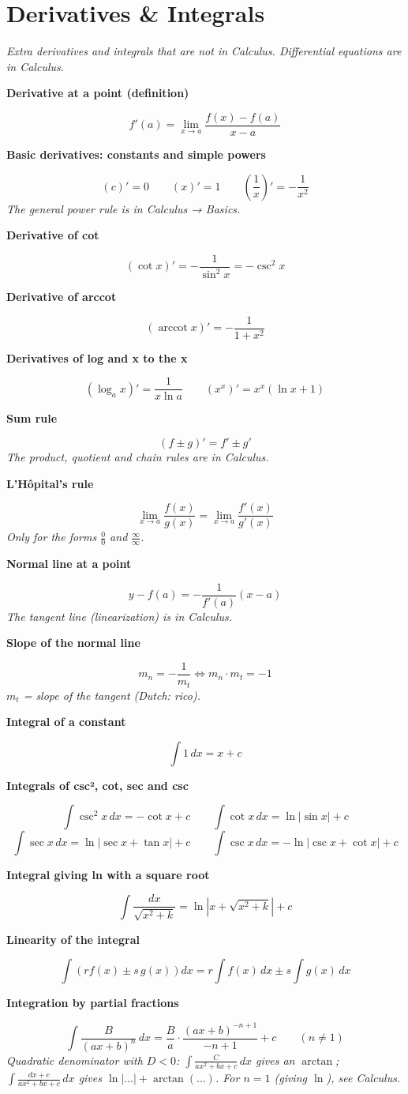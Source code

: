 \documentclass[11pt]{article}
\newcommand{\sect}[2]{\section*{\color{#1}#2}}
\newcommand{\sub}[1]{\par\medskip\textbf{#1}\par}
\newcommand{\expl}[1]{{\color{gray}\itshape #1}\par}
\begin{document}
\sect{cDer}{Derivatives \& Integrals}
\expl{Extra derivatives and integrals that are not in Calculus. Differential equations are in Calculus.}

\sub{Derivative at a point (definition)}
\[ f'(a) = \lim_{x\to a} \frac{f(x) - f(a)}{x - a} \]

\sub{Basic derivatives: constants and simple powers}
\[ (c)' = 0 \qquad (x)' = 1 \qquad \left(\frac{1}{x}\right)' = -\frac{1}{x^2} \]
\expl{The general power rule is in Calculus → Basics.}

\sub{Derivative of cot}
\[ (\cot x)' = -\frac{1}{\sin^2 x} = -\csc^2 x \]

\sub{Derivative of arccot}
\[ (\operatorname{arccot} x)' = -\frac{1}{1 + x^2} \]

\sub{Derivatives of log and x to the x}
\[ (\log_a x)' = \frac{1}{x\ln a} \qquad (x^x)' = x^x(\ln x + 1) \]

\sub{Sum rule}
\[ (f \pm g)' = f' \pm g' \]
\expl{The product, quotient and chain rules are in Calculus.}

\sub{L'Hôpital's rule}
\[ \lim_{x\to a} \frac{f(x)}{g(x)} = \lim_{x\to a} \frac{f'(x)}{g'(x)} \]
\expl{Only for the forms $\frac{0}{0}$ and $\frac{\infty}{\infty}$.}

\sub{Normal line at a point}
\[ y - f(a) = -\frac{1}{f'(a)}(x - a) \]
\expl{The tangent line (linearization) is in Calculus.}

\sub{Slope of the normal line}
\[ m_n = -\frac{1}{m_t} \iff m_n\cdot m_t = -1 \]
\expl{$m_t$ = slope of the tangent (Dutch: rico).}

\sub{Integral of a constant}
\[ \int 1\,dx = x + c \]

\sub{Integrals of csc², cot, sec and csc}
\[ \int \csc^2 x\,dx = -\cot x + c \qquad \int \cot x\,dx = \ln|\sin x| + c \]
\[ \int \sec x\,dx = \ln|\sec x + \tan x| + c \qquad \int \csc x\,dx = -\ln|\csc x + \cot x| + c \]

\sub{Integral giving ln with a square root}
\[ \int \frac{dx}{\sqrt{x^2 + k}} = \ln\left|x + \sqrt{x^2 + k}\right| + c \]

\sub{Linearity of the integral}
\[ \int \left(r f(x) \pm s\,g(x)\right)dx = r\int f(x)\,dx \pm s\int g(x)\,dx \]

\sub{Integration by partial fractions}
\[ \int \frac{B}{(ax + b)^n}\,dx = \frac{B}{a}\cdot\frac{(ax + b)^{-n+1}}{-n+1} + c \qquad (n \ne 1) \]
\expl{Quadratic denominator with $D < 0$: $\int \frac{C}{ax^2 + bx + c}\,dx$ gives an $\arctan$; $\int \frac{dx + e}{ax^2 + bx + c}\,dx$ gives $\ln|\dots| + \arctan(\dots)$. For $n = 1$ (giving $\ln$), see Calculus.}
\end{document}
